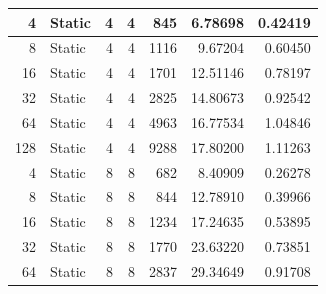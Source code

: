 \documentclass[journal,transmag]{IEEEtran}
\begin{document}
\begin{table}[h]
\begin{tabular}{|r|l|r|r|r|r|r|}
		4                             & Static   & 4                          & 4                          & 845                            & 6.78698                       & 0.42419                         \\ \hline
		8                             & Static   & 4                          & 4                          & 1116                           & 9.67204                       & 0.60450                         \\ \hline
		16                            & Static   & 4                          & 4                          & 1701                           & 12.51146                      & 0.78197                         \\ \hline
		32                            & Static   & 4                          & 4                          & 2825                           & 14.80673                      & 0.92542                         \\ \hline
		64                            & Static   & 4                          & 4                          & 4963                           & 16.77534                      & 1.04846                         \\ \hline
		128                           & Static   & 4                          & 4                          & 9288                           & 17.80200                      & 1.11263                         \\ \hline
		4                             & Static   & 8                          & 8                          & 682                            & 8.40909                       & 0.26278                         \\ \hline
		8                             & Static   & 8                          & 8                          & 844                            & 12.78910                      & 0.39966                         \\ \hline
		16                            & Static   & 8                          & 8                          & 1234                           & 17.24635                      & 0.53895                         \\ \hline
		32                            & Static   & 8                          & 8                          & 1770                           & 23.63220                      & 0.73851                         \\ \hline
		64                            & Static   & 8                          & 8                          & 2837                           & 29.34649                      & 0.91708                         \\ \hline

\end{tabular}
\end{table}
\end{document}
